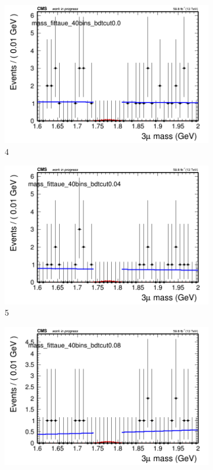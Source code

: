 \begin{figure}[h!]
\begin{subfigure}{0.2\textwidth}
        \includegraphics[width=\textwidth]{unfixed_exp/plots/taue/massfit_taue_40bins_bdtcut0.0.png}
        \caption{4}
    \end{subfigure}
    \begin{subfigure}{0.2\textwidth}
        \includegraphics[width=\textwidth]{unfixed_exp/plots/taue/massfit_taue_40bins_bdtcut0.04.png}
        \caption{5}
    \end{subfigure}
    \begin{subfigure}{0.2\textwidth}
        \includegraphics[width=\textwidth]{unfixed_exp/plots/taue/massfit_taue_40bins_bdtcut0.08.png}

\end{subfigure}
\end{figure}
